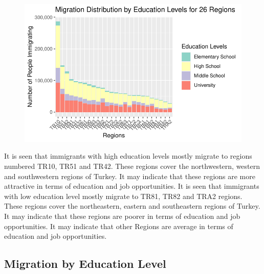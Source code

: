 \documentclass[
  11pt,
  a4paper,
  DIV=11,
  numbers=noendperiod]{scrartcl}
\begin{document}
\begin{figure}[H]

{\centering \includegraphics{analysis_files/figure-pdf/unnamed-chunk-10-1.pdf}

}

\end{figure}

It is seen that immigrants with high education levels mostly migrate to
regions numbered TR10, TR51 and TR42. These regions cover the
northwestern, western and southwestern regions of Turkey. It may
indicate that these regions are more attractive in terms of education
and job opportunities. It is seen that immigrants with low education
level mostly migrate to TR81, TR82 and TRA2 regions. These regions cover
the northeastern, eastern and southeastern regions of Turkey. It may
indicate that these regions are poorer in terms of education and job
opportunities. It may indicate that other Regions are average in terms
of education and job opportunities.

\hypertarget{migration-by-education-level}{%
\subsection{Migration by Education
Level}\label{migration-by-education-level}}
\end{document}

